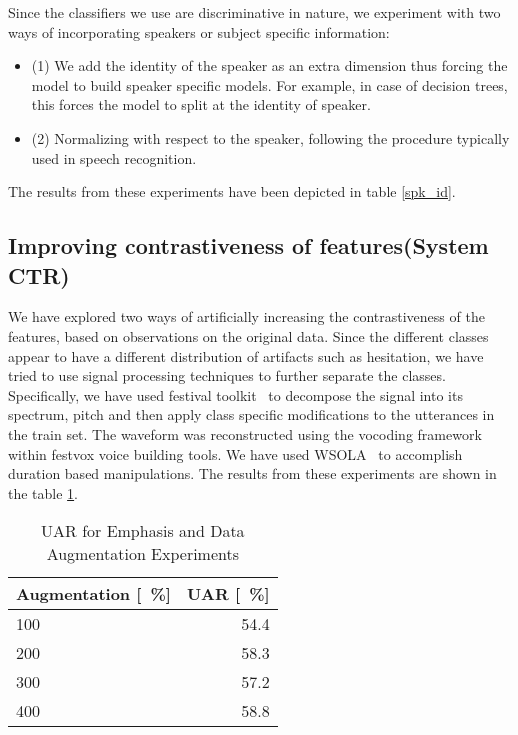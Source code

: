 Since the classifiers we use are discriminative in nature, we experiment with  two ways of incorporating speakers or subject specific information: 

\begin{itemize}

\item (1) We add the identity of the speaker as an extra dimension thus forcing the model to build speaker specific models.  For example, in case of decision trees, this forces the model to split at the identity of speaker.

\item (2) Normalizing with respect to the speaker, following the procedure typically used in speech recognition. 

\end{itemize}

The results from these experiments have been depicted in table \ref{spk_id}. 

\subsection{Improving contrastiveness of features(System CTR)}
We have explored two ways of artificially increasing  the contrastiveness of the features, based on observations on the original data. Since the different classes appear to have a different distribution of artifacts such  as hesitation, we have tried to use signal processing techniques to further separate the classes. Specifically, we have used festival toolkit~\cite{black1998festival} to decompose the signal into its spectrum, pitch and then apply class specific modifications to the utterances in the train set. The waveform was reconstructed using the vocoding framework within festvox voice building tools. We have used WSOLA~\cite{verhelst1993overlap} to accomplish duration based manipulations. The results from these experiments are shown in the table \ref{emph}.

\begin{table}[H]
\centering
\caption{UAR for Emphasis and Data Augmentation Experiments}
\label{emph}
\begin{tabular}{lr}
Augmentation [\SI{}{\percent}] & UAR [\SI{}{\percent}]       \\ \toprule
100  & \SI{54.4}{}                    \\
200                                        & \SI{58.3}{}                    \\
300                                        & \SI{57.2}{}                      \\
400                                        & \SI[detect-weight]{58.8}{} \\
\bottomrule
\end{tabular}
\end{table}


